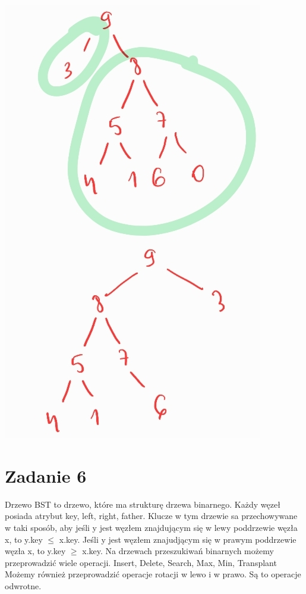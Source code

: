 \documentclass[12pt]{article}
\begin{document}
\includegraphics[scale=0.5]{zad5_3.png}

\section{Zadanie 6}

Drzewo BST to drzewo, które ma strukturę drzewa binarnego. Każdy węzeł posiada atrybut key, left, right, father. Klucze w tym drzewie sa przechowywane w taki sposób, aby jeśli y jest węzłem znajdującym się w lewy poddrzewie węzła x, to y.key $\leq$ x.key. Jeśli y jest węzłem znajudjącym się w prawym poddrzewie węzła x, to y.key $\geq$ x.key.
Na drzewach przeszukiwań binarnych możemy przeprowadzić wiele operacji. Insert, Delete, Search, Max, Min, Transplant
Możemy również przeprowadzić operacje rotacji w lewo i w prawo. Są to operacje odwrotne.
\end{document}
